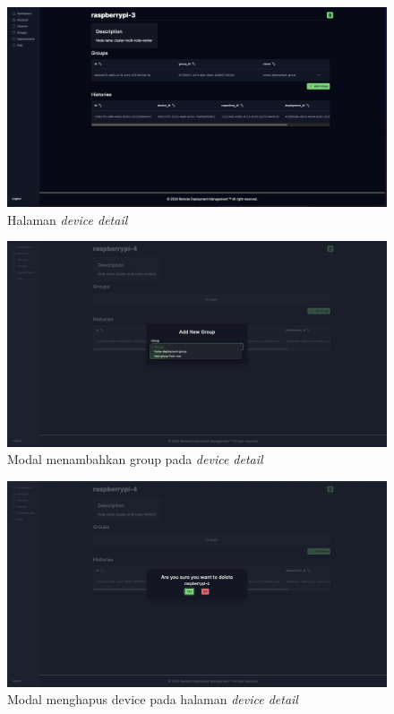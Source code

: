 \begin{figure}
  \centering
  \includegraphics[width=1\textwidth]{resources/chapter-4/dashboard/device-detail-page.jpg}
  \caption{Halaman \textit{device detail}}
  \label{fig:halaman-device-detail}
\end{figure}

\begin{figure}
  \centering
  \includegraphics[width=1\textwidth]{resources/chapter-4/dashboard/device-detail-add-group.jpg}
  \caption{Modal menambahkan group pada \textit{device detail}}
  \label{fig:halaman-device-detail-add-group}
\end{figure}

\begin{figure}
  \centering
  \includegraphics[width=1\textwidth]{resources/chapter-4/dashboard/device-detail-delete.jpg}
  \caption{Modal menghapus device pada halaman \textit{device detail}}
  \label{fig:halaman-device-detail-delete}
\end{figure}

